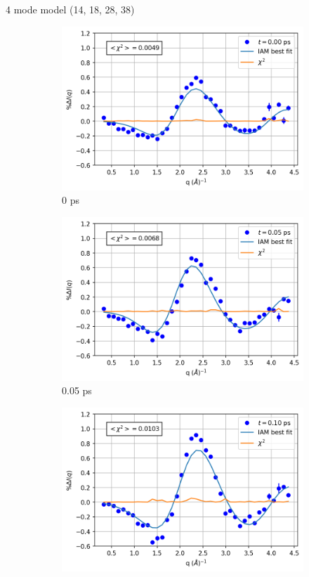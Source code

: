 \documentclass{beamer}
\newcommand\w{0.32}
\begin{document}
\begin{frame}{4 mode model (14, 18, 28, 38)}
\begin{figure}
\begin{subfigure}[b]{\w\textwidth}
			\includegraphics[width=\textwidth]{figures/10000_vstrongmodes_0.00.png}
			\caption{0 ps}
		\end{subfigure}
		\begin{subfigure}[b]{\w\textwidth}
			\centering
			\includegraphics[width=\textwidth]{figures/10000_vstrongmodes_0.05.png}
			\caption{0.05 ps}
		\end{subfigure}
		\begin{subfigure}[b]{\w\textwidth}
			\centering
			\includegraphics[width=\textwidth]{figures/10000_vstrongmodes_0.10.png}

\end{subfigure}
\end{figure}
\end{frame}
\end{document}

